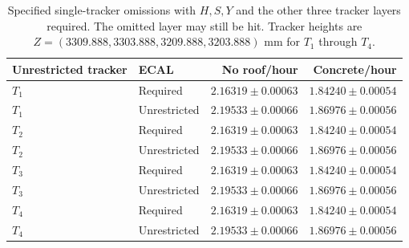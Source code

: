 \begin{table}[htbp]
\centering\footnotesize
\caption{Specified single-tracker omissions with $H,S,Y$ and the other three tracker layers required. The omitted layer may still be hit. Tracker heights are $Z=(3309.888,3303.888,3209.888,3203.888)$ mm for $T_1$ through $T_4$.}\label{tab:tracker}
\begin{tabular}{llrr}
\toprule
Unrestricted tracker & ECAL & No roof/hour & Concrete/hour\\
\midrule
$T_1$ & Required & $2.16319\pm0.00063$ & $1.84240\pm0.00054$\\
$T_1$ & Unrestricted & $2.19533\pm0.00066$ & $1.86976\pm0.00056$\\
$T_2$ & Required & $2.16319\pm0.00063$ & $1.84240\pm0.00054$\\
$T_2$ & Unrestricted & $2.19533\pm0.00066$ & $1.86976\pm0.00056$\\
$T_3$ & Required & $2.16319\pm0.00063$ & $1.84240\pm0.00054$\\
$T_3$ & Unrestricted & $2.19533\pm0.00066$ & $1.86976\pm0.00056$\\
$T_4$ & Required & $2.16319\pm0.00063$ & $1.84240\pm0.00054$\\
$T_4$ & Unrestricted & $2.19533\pm0.00066$ & $1.86976\pm0.00056$\\
\bottomrule
\end{tabular}
\end{table}
